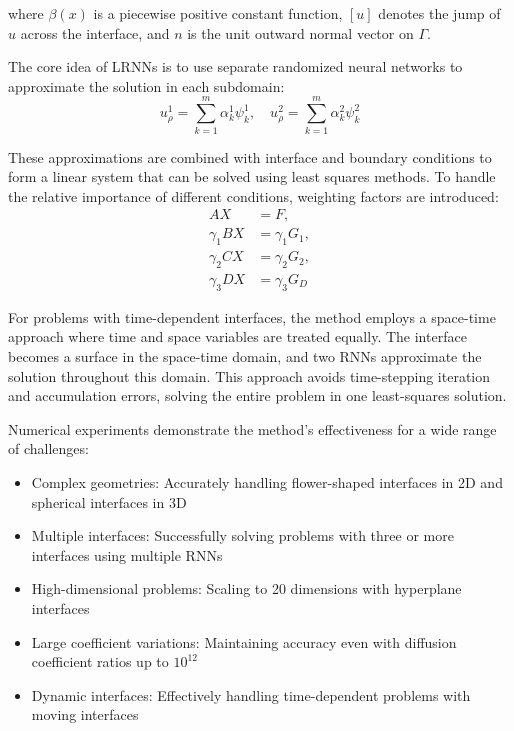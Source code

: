 \documentclass[11pt]{article}
\begin{document}
where $\beta(x)$ is a piecewise positive constant function, $[u]$ denotes the jump of $u$ across the interface, and $n$ is the unit outward normal vector on $\Gamma$.

The core idea of LRNNs is to use separate randomized neural networks to approximate the solution in each subdomain:
\begin{equation}
u_\rho^1 = \sum_{k=1}^{m} \alpha_k^1 \psi_k^1, \quad u_\rho^2 = \sum_{k=1}^{m} \alpha_k^2 \psi_k^2
\end{equation}

These approximations are combined with interface and boundary conditions to form a linear system that can be solved using least squares methods. To handle the relative importance of different conditions, weighting factors are introduced:
\begin{align}
AX &= F, \\
\gamma_1 BX &= \gamma_1 G_1, \\
\gamma_2 CX &= \gamma_2 G_2, \\
\gamma_3 DX &= \gamma_3 G_D
\end{align}

For problems with time-dependent interfaces, the method employs a space-time approach where time and space variables are treated equally. The interface becomes a surface in the space-time domain, and two RNNs approximate the solution throughout this domain. This approach avoids time-stepping iteration and accumulation errors, solving the entire problem in one least-squares solution.

Numerical experiments demonstrate the method's effectiveness for a wide range of challenges:
\begin{itemize}
    \item Complex geometries: Accurately handling flower-shaped interfaces in 2D and spherical interfaces in 3D
    \item Multiple interfaces: Successfully solving problems with three or more interfaces using multiple RNNs
    \item High-dimensional problems: Scaling to 20 dimensions with hyperplane interfaces
    \item Large coefficient variations: Maintaining accuracy even with diffusion coefficient ratios up to $10^{12}$
    \item Dynamic interfaces: Effectively handling time-dependent problems with moving interfaces
\end{itemize}
\end{document}
